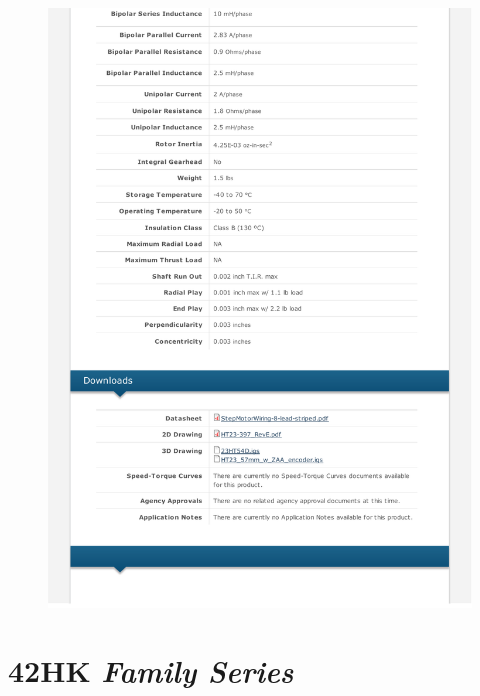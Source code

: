 \newpage
\begin{figure}[h!]   
\begin{centering}
\includegraphics[width=0.8\columnwidth]{datasheets/ht23-397-p2.pdf}
\par\end{centering}

\end{figure}

\newpage
\section{42HK \textit{Family Series}}

\label{42HK}

